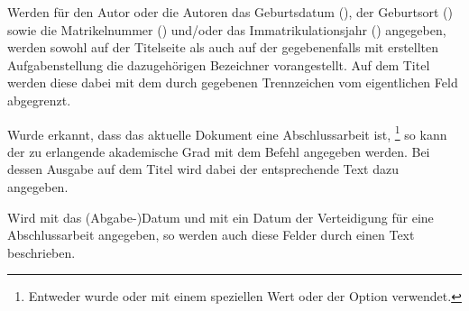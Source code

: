 \begin{Declaration*}{}
\begin{Declaration*}{}
\begin{Declaration*}{}
\begin{Declaration}{}
\begin{Declaration}{}
\begin{Declaration}{}
\begin{Declaration}{}
\printdeclarationlist%
%
%
%
Werden für den Autor oder die Autoren das Geburtsdatum (), 
der Geburtsort () sowie die
Matrikelnummer () und/oder das Immatrikulationsjahr 
() angegeben, werden sowohl auf der Titelseite als 
auch auf der gegebenenfalls mit  erstellten 
Aufgabenstellung die dazugehörigen Bezeichner vorangestellt. Auf dem Titel 
werden diese dabei mit dem durch  gegebenen Trennzeichen 
vom eigentlichen Feld abgegrenzt.
\end{Declaration}
\end{Declaration}
\end{Declaration}
\end{Declaration}

\begin{Declaration}[v2.02]{}
\printdeclarationlist%
%
%
%
Wurde erkannt, dass das aktuelle Dokument eine Abschlussarbeit ist,%
\footnote{%
  Entweder wurde  oder  mit einem speziellen Wert 
  oder der Option  verwendet.
}
so kann der zu erlangende akademische Grad mit dem Befehl  
angegeben werden. Bei dessen Ausgabe auf dem Titel wird dabei der entsprechende 
Text dazu angegeben.
\end{Declaration}

\begin{Declaration}{}
\begin{Declaration}{}
\printdeclarationlist%
%
%
%
%
%
Wird mit  das (Abgabe-)Datum und mit  ein Datum 
der Verteidigung für eine Abschlussarbeit angegeben, so werden auch diese 
Felder durch einen Text beschrieben.
%
\end{Declaration}
\end{Declaration}


\end{Declaration*}
\end{Declaration*}
\end{Declaration*}

